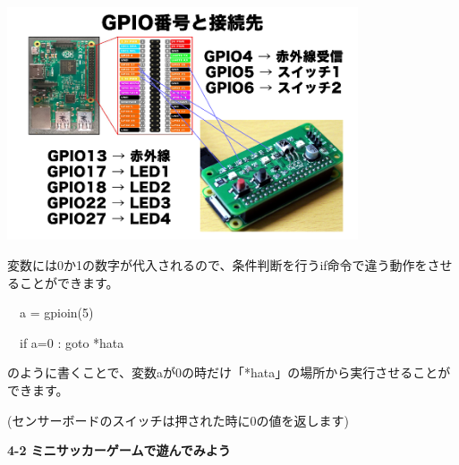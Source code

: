 \documentclass[a4paper,dvipdfmx]{jarticle}
\begin{document}
\begin{center}
\includegraphics[width=10.372cm,height=6.89cm]{text04-img/text04-img004.png}

\end{center}

\bigskip


\bigskip


\bigskip


\bigskip


\bigskip


\bigskip


\bigskip


\bigskip


\bigskip


\bigskip


\bigskip


\bigskip


\bigskip


\bigskip


\bigskip


\bigskip


\bigskip

変数には0か1の数字が代入されるので、条件判断を行うif命令で違う動作をさせることができます。


\bigskip

\ \ a = gpioin(5)

\ \ if a=0 : goto *hata


\bigskip

のように書くことで、変数aが0の時だけ「*hata」の場所から実行させることができます。

(センサーボードのスイッチは押された時に0の値を返します)


\bigskip


\bigskip

{\bfseries
4-2 ミニサッカーゲームで遊んでみよう}
\end{document}
